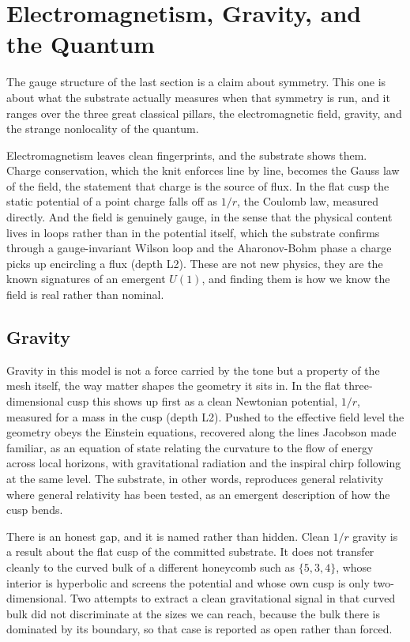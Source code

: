 \section{Electromagnetism, Gravity, and the Quantum}

The gauge structure of the last section is a claim about symmetry. This one is about what the substrate actually measures when that symmetry is run, and it ranges over the three great classical pillars, the electromagnetic field, gravity, and the strange nonlocality of the quantum.

Electromagnetism leaves clean fingerprints, and the substrate shows them. Charge conservation, which the knit enforces line by line, becomes the Gauss law of the field, the statement that charge is the source of flux. In the flat cusp the static potential of a point charge falls off as $1/r$, the Coulomb law, measured directly. And the field is genuinely gauge, in the sense that the physical content lives in loops rather than in the potential itself, which the substrate confirms through a gauge-invariant Wilson loop and the Aharonov-Bohm phase a charge picks up encircling a flux (depth L2). These are not new physics, they are the known signatures of an emergent $U(1)$, and finding them is how we know the field is real rather than nominal.

\subsection{Gravity}

Gravity in this model is not a force carried by the tone but a property of the mesh itself, the way matter shapes the geometry it sits in. In the flat three-dimensional cusp this shows up first as a clean Newtonian potential, $1/r$, measured for a mass in the cusp (depth L2). Pushed to the effective field level the geometry obeys the Einstein equations, recovered along the lines Jacobson made familiar, as an equation of state relating the curvature to the flow of energy across local horizons, with gravitational radiation and the inspiral chirp following at the same level. The substrate, in other words, reproduces general relativity where general relativity has been tested, as an emergent description of how the cusp bends.

There is an honest gap, and it is named rather than hidden. Clean $1/r$ gravity is a result about the flat cusp of the committed substrate. It does not transfer cleanly to the curved bulk of a different honeycomb such as $\{5,3,4\}$, whose interior is hyperbolic and screens the potential and whose own cusp is only two-dimensional. Two attempts to extract a clean gravitational signal in that curved bulk did not discriminate at the sizes we can reach, because the bulk there is dominated by its boundary, so that case is reported as open rather than forced.

